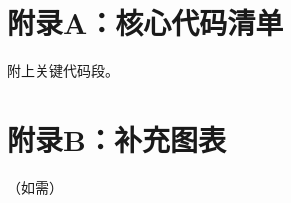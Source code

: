 \appendix
\section{附录A：核心代码清单}
\label{app:code}
附上关键代码段。

\section{附录B：补充图表}
\label{app:figures}
（如需）
